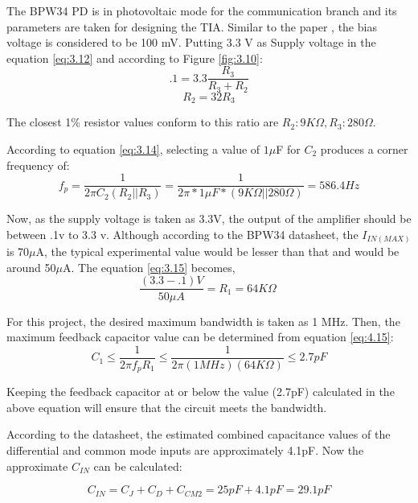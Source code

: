 The BPW34 \ac{PD} is in photovoltaic mode for the communication branch and its parameters are taken for designing the \ac{TIA}. Similar to the paper \cite{caldwell1mhz}, the bias voltage is considered to be 100 mV. Putting 3.3 V as Supply voltage in the equation \ref{eq:3.12} and according to Figure \ref{fig:3.10}:
\begin{equation}
\ .1 =  3.3 \frac{ R_3 }{R_3 + R_2} \
\label{eq:4.11}
\end{equation}
\begin{equation}
\  R_2 = 32R_3 \
\label{eq:4.12}
\end{equation}

The closest 1\% resistor values conform to this ratio are \(R_2:9K\Omega, R_3: 280\Omega \).

According to equation \ref{eq:3.14}, selecting a value of \(1\mu\)F  for \(C_{2}\)  produces a corner frequency of:
\begin{equation}
\ f_{p} = \frac{ 1 }{2 \pi C_2 (R_2||R_3)} = \frac{ 1 }{2 \pi *1\mu F * (9K\Omega||280\Omega)} = 586.4Hz \
\label{eq:4.13}
\end{equation}

Now, as the supply voltage is taken as 3.3V, the output of the amplifier should be between .1v to 3.3 v. Although according to the BPW34 datasheet, the \(I_{IN(MAX)}\) is 70\(\mu\)A, the typical experimental value would be lesser than that and would be around 50\(\mu\)A. The equation \ref{eq:3.15} becomes,
\begin{equation}
\frac{ (3.3-.1)V}{50\mu A} = {R_1} = 64K\Omega \
\label{eq:4.14}
\end{equation} 

For this project, the desired maximum bandwidth is taken as 1 MHz. Then, the maximum feedback capacitor value can be determined from equation \ref{eq:4.15}:
\begin{equation}
\ C_1 \leq \frac{ 1 }{2 \pi f_{p} R_1} \leq \frac{ 1 }{2 \pi (1MHz) (64K\Omega)} \leq 2.7pF  \
\label{eq:4.15}
\end{equation}

Keeping the feedback capacitor at or below the value (2.7pF) calculated in the above equation will ensure that the circuit meets the bandwidth.

According to the datasheet, the estimated combined capacitance values of the differential and common mode inputs are approximately 4.1pF. Now the approximate \(C_{IN}\) can be calculated:
 
\begin{equation}
\ C_{IN} = C_J + C_D + C_{CM2} = 25pF + 4.1pF = 29.1pF \
\label{eq:4.16}
\end{equation}

